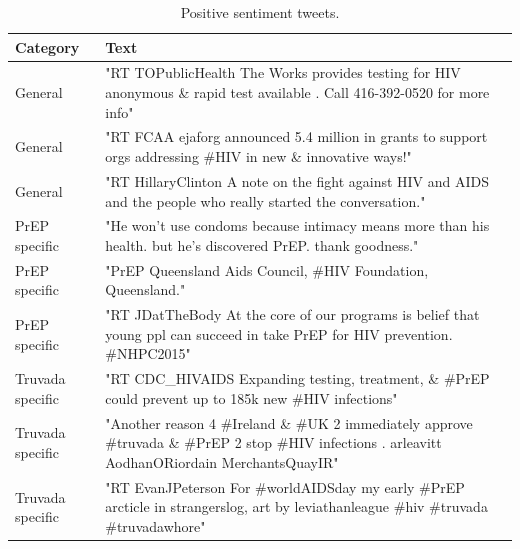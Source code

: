 \documentclass{sig-alternate-05-2015}
\begin{document}
\begin{table}
\centering
\caption{Positive sentiment tweets.}
\begin{tabular}{|p{2.5cm}|p{12cm}|} \hline
Category & Text\\ \hline
General & "RT TOPublicHealth The Works provides testing for HIV anonymous \& rapid test available . Call 416-392-0520 for more info"\\ \hline
General & "RT FCAA ejaforg announced 5.4 million in grants to support orgs addressing \#HIV in new \& innovative ways!"\\ \hline
General & "RT HillaryClinton A note on the fight against HIV and AIDS and the people who really started the conversation."\\ \hline

PrEP specific & "He won't use condoms because intimacy means more than his health. but he's discovered PrEP. thank goodness."\\ \hline
PrEP specific & "PrEP Queensland Aids Council, \#HIV Foundation, Queensland."\\ \hline
PrEP specific & "RT JDatTheBody At the core of our programs is belief that young ppl can succeed in take PrEP for HIV prevention. \#NHPC2015"\\ \hline

Truvada specific & "RT CDC\_HIVAIDS Expanding testing, treatment, \& \#PrEP could prevent up to 185k new \#HIV infections"\\ \hline
Truvada specific & "Another reason 4 \#Ireland \& \#UK 2 immediately approve \#truvada \& \#PrEP 2 stop \#HIV infections . arleavitt AodhanORiordain MerchantsQuayIR"\\ \hline
Truvada specific & "RT EvanJPeterson For \#worldAIDSday my early \#PrEP arcticle in strangerslog, art by leviathanleague \#hiv \#truvada \#truvadawhore"\\ \hline

\hline\end{tabular}
\end{table}
\end{document}
